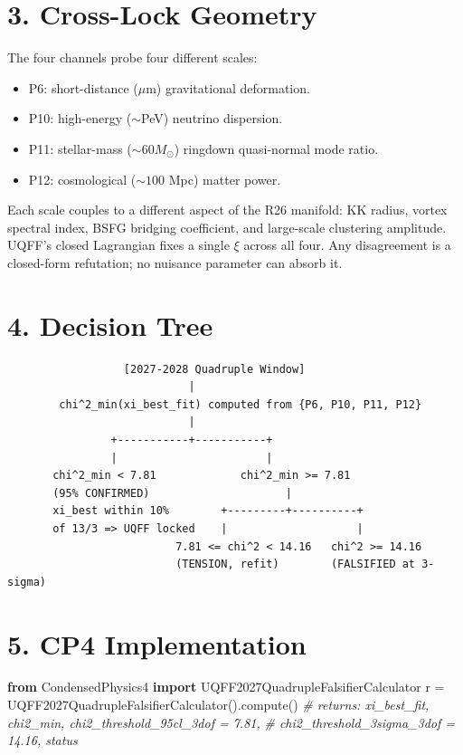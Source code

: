 \documentclass[
  11pt,
]{article}
\newenvironment{Shaded}{}{}
\newcommand{\CommentTok}[1]{\textcolor[rgb]{0.38,0.63,0.69}{\textit{#1}}}
\newcommand{\ImportTok}[1]{\textcolor[rgb]{0.00,0.50,0.00}{\textbf{#1}}}
\newcommand{\NormalTok}[1]{#1}
\newcommand{\OperatorTok}[1]{\textcolor[rgb]{0.40,0.40,0.40}{#1}}
\providecommand{\tightlist}{%
  \setlength{\itemsep}{0pt}\setlength{\parskip}{0pt}}
\begin{document}
\section{3. Cross-Lock Geometry}\label{cross-lock-geometry}

The four channels probe four different scales:

\begin{itemize}
\tightlist
\item
  P6: short-distance (\(\mu\)m) gravitational deformation.
\item
  P10: high-energy (\(\sim\)PeV) neutrino dispersion.
\item
  P11: stellar-mass (\(\sim 60 M_\odot\)) ringdown quasi-normal mode
  ratio.
\item
  P12: cosmological (\(\sim 100\) Mpc) matter power.
\end{itemize}

Each scale couples to a different aspect of the R26 manifold: KK radius,
vortex spectral index, BSFG bridging coefficient, and large-scale
clustering amplitude. UQFF's closed Lagrangian fixes a single \(\xi\)
across all four. Any disagreement is a closed-form refutation; no
nuisance parameter can absorb it.

\section{4. Decision Tree}\label{decision-tree}

\begin{verbatim}
                  [2027-2028 Quadruple Window]
                            |
        chi^2_min(xi_best_fit) computed from {P6, P10, P11, P12}
                            |
                +-----------+-----------+
                |                       |
       chi^2_min < 7.81             chi^2_min >= 7.81
       (95% CONFIRMED)                     |
       xi_best within 10%        +---------+----------+
       of 13/3 => UQFF locked    |                    |
                          7.81 <= chi^2 < 14.16   chi^2 >= 14.16
                          (TENSION, refit)        (FALSIFIED at 3-sigma)
\end{verbatim}

\section{5. CP4 Implementation}\label{cp4-implementation}

\begin{Shaded}
\begin{Highlighting}[]
\ImportTok{from}\NormalTok{ CondensedPhysics4 }\ImportTok{import}\NormalTok{ UQFF2027QuadrupleFalsifierCalculator}
\NormalTok{r }\OperatorTok{=}\NormalTok{ UQFF2027QuadrupleFalsifierCalculator().compute()}
\CommentTok{\# returns: xi\_best\_fit, chi2\_min, chi2\_threshold\_95cl\_3dof = 7.81,}
\CommentTok{\#          chi2\_threshold\_3sigma\_3dof = 14.16, status}
\end{Highlighting}
\end{Shaded}
\end{document}

